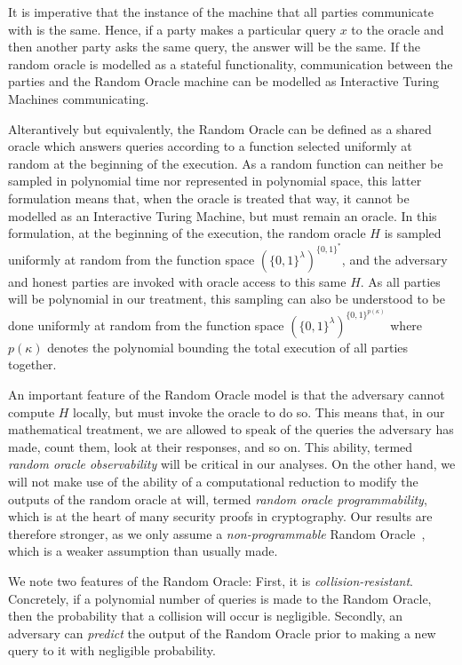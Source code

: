 It is imperative that the instance of the machine that all parties communicate
with is the same. Hence, if a party makes a particular query $x$ to the oracle
and then another party asks the same query, the answer will be the same. If the
random oracle is modelled as a stateful functionality, communication between the
parties and the Random Oracle machine can be modelled as Interactive Turing
Machines communicating.

Alterantively but equivalently, the Random Oracle can be defined as a shared
oracle which answers queries according to a function selected uniformly at
random at the beginning of the execution. As a random function can neither be
sampled in polynomial time nor represented in polynomial space, this latter
formulation means that, when the oracle is treated that way, it cannot be
modelled as an Interactive Turing Machine, but must remain an oracle. In this
formulation, at the beginning of the execution, the random oracle $H$ is sampled
uniformly at random from the function space $(\{0, 1\}^\lambda)^{\{0, 1\}^*}$,
and the adversary and honest parties are invoked with oracle access to this same
$H$. As all parties will be polynomial in our treatment, this sampling can also
be understood to be done uniformly at random from the function space $(\{0,
1\}^\lambda)^{\{0, 1\}^{p(\kappa)}}$ where $p(\kappa)$ denotes the polynomial
bounding the total execution of all parties together.

An important feature of the Random Oracle model is that the adversary cannot
compute $H$ locally, but must invoke the oracle to do so. This means that, in
our mathematical treatment, we are allowed to speak of the queries the adversary
has made, count them, look at their responses, and so on. This ability, termed
\emph{random oracle observability} will be critical in our analyses. On the
other hand, we will not make use of the ability of a computational reduction to
modify the outputs of the random oracle at will, termed \emph{random oracle
programmability}, which is at the heart of many security proofs in cryptography.
Our results are therefore stronger, as we only assume a \emph{non-programmable}
Random Oracle~\cite{nielsen2002separating,fischlin2010random}, which is a weaker
assumption than usually made.

We note two features of the Random Oracle: First, it is
\emph{collision-resistant}. Concretely, if a polynomial number of queries is
made to the Random Oracle, then the probability that a collision will occur is
negligible. Secondly, an adversary can \emph{predict} the output of the Random
Oracle prior to making a new query to it with negligible probability.

